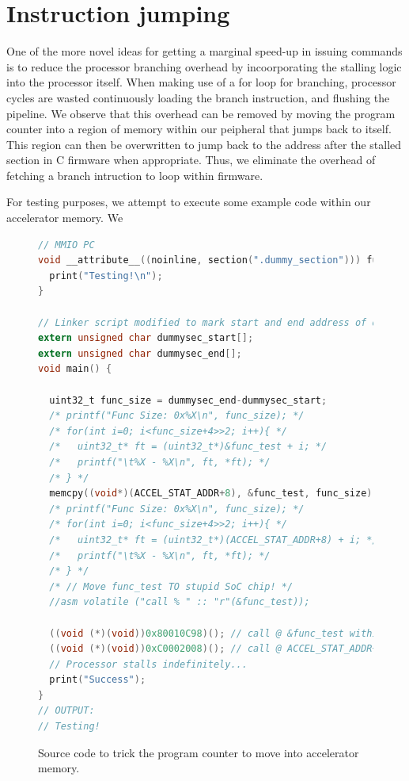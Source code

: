 \documentclass[a4paper,8pt]{report}
\begin{document}
\section{Instruction jumping}
One of the more novel ideas for getting a marginal speed-up in issuing commands
is to reduce the processor branching overhead by incoorporating the stalling
logic into the processor itself. When making use of a for loop for branching,
processor cycles are wasted continuously loading the branch instruction, and
flushing the pipeline. We observe that this overhead can be removed by moving
the program counter into a region of memory within our peipheral that jumps back
to itself. This region can then be overwritten to jump back to the address after
the stalled section in C firmware when appropriate. Thus, we eliminate the
overhead of fetching a branch intruction to loop within firmware.

For testing purposes, we attempt to execute some example code within our
accelerator memory. We  

\begin{figure}[h]
\begin{lstlisting}[language=C,style=customc,xleftmargin=0.05\textwidth]
// MMIO PC
void __attribute__((noinline, section(".dummy_section"))) func_test() {
  print("Testing!\n");
}

// Linker script modified to mark start and end address of our function above
extern unsigned char dummysec_start[];
extern unsigned char dummysec_end[];
void main() {

  uint32_t func_size = dummysec_end-dummysec_start;
  /* printf("Func Size: 0x%X\n", func_size); */
  /* for(int i=0; i<func_size+4>>2; i++){ */
  /*   uint32_t* ft = (uint32_t*)&func_test + i; */
  /*   printf("\t%X - %X\n", ft, *ft); */
  /* } */
  memcpy((void*)(ACCEL_STAT_ADDR+8), &func_test, func_size);
  /* printf("Func Size: 0x%X\n", func_size); */
  /* for(int i=0; i<func_size+4>>2; i++){ */
  /*   uint32_t* ft = (uint32_t*)(ACCEL_STAT_ADDR+8) + i; */
  /*   printf("\t%X - %X\n", ft, *ft); */
  /* } */
  /* // Move func_test TO stupid SoC chip! */
  //asm volatile ("call % " :: "r"(&func_test));

  ((void (*)(void))0x80010C98)(); // call @ &func_test within RAM -- works
  ((void (*)(void))0xC0002008)(); // call @ ACCEL_STAT_ADDR+8 within Accelerator
  // Processor stalls indefinitely...
  print("Success");
}
// OUTPUT:
// Testing!
\end{lstlisting}
  \caption{Source code to trick the program counter to move into accelerator memory.}
\end{figure}
\end{document}

